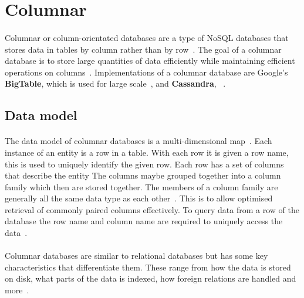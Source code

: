 \documentclass{CRPITStyle}
\renewcommand{\cite}{\citep}
\begin{document}

\section{Columnar}

\paragraph{}
Columnar or column-orientated databases are a type of NoSQL databases that
stores data in tables by column rather than by row~\cite{nosql_survey}.
The goal of a columnar database is to store large quantities of data efficiently
while maintaining efficient operations on columns~\cite{nosql_survey,nosql_eval}.
Implementations of a columnar database are Google's
\textbf{BigTable}, which is used for large scale~\cite{bigtable}, and
\textbf{Cassandra}, ~\cite{cassandra}.

\subsection{Data model}

\paragraph{}
The data model of columnar databases is a multi-dimensional
map~\cite{bigtable,nosql_eval}.
Each instance of an entity is a row in a table.
With each row it is given a row name, this is used to uniquely identify the
given row.
Each row has a set of columns that describe the entity
The columns maybe grouped together into a column family which then are
stored together.
The members of a column family are generally all the same data type as each
other~\cite{bigtable}.
This is to allow optimised retrieval of commonly paired columns effectively.
To query data from a row of the database the row name and column name are
required to uniquely access the data~\cite{bigtable}.

\paragraph{}
Columnar databases are similar to relational databases but has some key
characteristics that differentiate them.
These range from how the data is stored on disk, what parts of the
data is indexed, how foreign relations are handled and more~\cite{nosql_survey}.
\end{document}
